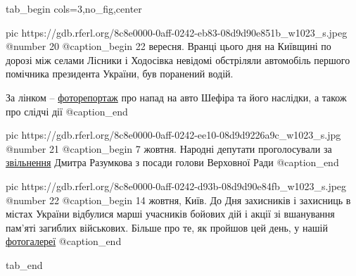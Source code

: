  
 
 
 
 


\ifcmt
  tab_begin cols=3,no_fig,center

     pic https://gdb.rferl.org/8c8e0000-0aff-0242-eb83-08d9d90e851b_w1023_s.jpeg
		 @number 20
		 @caption_begin
22 вересня. Вранці цього дня на Київщині по дорозі між селами Лісники і
Ходосівка невідомі обстріляли автомобіль першого помічника президента України,
був поранений водій. 

За лінком – \href{https://www.radiosvoboda.org/a/photo-avto-shefir-zamakh/31473119.html}{фоторепортаж}
про напад на авто Шефіра та його наслідки, а також про слідчі дії 
		 @caption_end

		 pic https://gdb.rferl.org/8c8e0000-0aff-0242-ee10-08d9d9226a9c_w1023_s.jpg
		 @number 21
		 @caption_begin
7 жовтня. Народні депутати проголосували за
\href{https://www.radiosvoboda.org/a/vidstavka-dmytra-razumkova/31498339.html}{звільнення}
Дмитра Разумкова з посади голови Верховної Ради
		 @caption_end

		 pic https://gdb.rferl.org/8c8e0000-0aff-0242-d93b-08d9d90e84fb_w1023_s.jpeg
		 @number 22
		 @caption_begin
14 жовтня, Київ. До Дня захисників і захисниць в містах України
відбулися марші учасників бойових дій і акції зі вшанування пам’яті
загиблих військових. Більше про те, як пройшов цей день, у нашій
\href{https://www.radiosvoboda.org/a/photo-den-zakhysnykiv-i-zakhysnyts-ukrayny/31509704.html}{фотогалереї}
		 @caption_end

  tab_end
\fi
